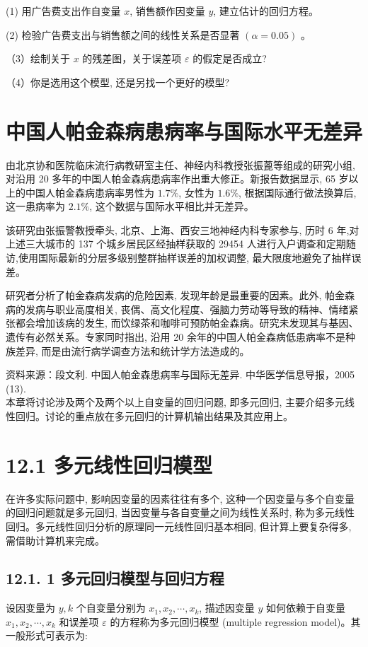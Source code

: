 \documentclass[10pt]{article}
\begin{document}
\begin{CJK*}{UTF8}{bsmi}
(1) 用广告费支出作自变量 $x$, 销售额作因变量 $y$, 建立估计的回归方程。

(2) 检验广告费支出与销售额之间的线性关系是否显著 $(\alpha=0.05)$ 。

（3）绘制关于 $x$ 的残差图，关于误差项 $\varepsilon$ 的假定是否成立?

（4）你是选用这个模型, 还是另找一个更好的模型?\\

\section*{中国人帕金森病患病率与国际水平无差异}
由北京协和医院临床流行病教研室主任、神经内科教授张振蓖等组成的研究小组,对沿用 20 多年的中国人帕金森病患病率作出重大修正。新报告数据显示, 65 岁以上的中国人帕金森病患病率男性为 $1.7 \%$, 女性为 $1.6 \%$, 根据国际通行做法换算后, 这一患病率为 $2.1 \%$, 这个数据与国际水平相比并无差异。

该研究由张振警教授牵头, 北京、上海、西安三地神经内科专家参与, 历时 6 年,对上述三大城市的 137 个城乡居民区经抽样获取的 29454 人进行入户调查和定期随访,使用国际最新的分层多级别整群抽样误差的加权调整, 最大限度地避免了抽样误差。

研究者分析了帕金森病发病的危险因素, 发现年龄是最重要的因素。此外, 帕金森病的发病与职业高度相关, 丧偶、高文化程度、强脑力劳动等导致的精神、情绪紧张都会增加该病的发生, 而饮绿茶和咖啡可预防帕金森病。研究未发现其与基因、遗传有必然关系。专家同时指出, 沿用 20 余年的中国人帕金森病低患病率不是种族差异, 而是由流行病学调查方法和统计学方法造成的。

资料来源：段文利. 中国人帕金森患病率与国际无差异. 中华医学信息导报，2005 (13).\\
本章将讨论涉及两个及两个以上自变量的回归问题, 即多元回归, 主要介绍多元线性回归。讨论的重点放在多元回归的计算机输出结果及其应用上。

\section*{12.1 多元线性回归模型}
在许多实际问题中, 影响因变量的因素往往有多个, 这种一个因变量与多个自变量的回归问题就是多元回归, 当因变量与各自变量之间为线性关系时, 称为多元线性回归。多元线性回归分析的原理同一元线性回归基本相同, 但计算上要复杂得多, 需借助计算机来完成。

\subsection*{12.1. 1 多元回归模型与回归方程}
设因变量为 $y, k$ 个自变量分别为 $x_{1}, x_{2}, \cdots, x_{k}$, 描述因变量 $y$ 如何依赖于自变量 $x_{1}, x_{2}, \cdots, x_{k}$ 和误差项 $\varepsilon$ 的方程称为多元回归模型 (multiple regression model)。其一般形式可表示为:



\end{CJK*}
\end{document}
